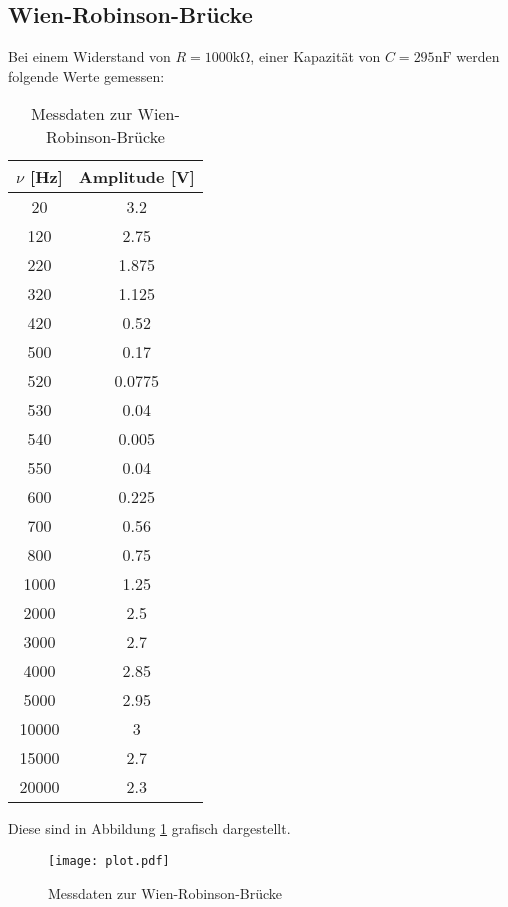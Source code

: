 \subsection{Wien-Robinson-Brücke}
  Bei einem Widerstand von $R=1000 \si{\kilo\ohm}$, einer Kapazität von $C = 295 \si{\nano\farad}$
  werden folgende Werte gemessen:
  \begin{table}[H]
    \centering
    \caption{Messdaten zur Wien-Robinson-Brücke}
    \label{tab:some}
    \begin{tabular}{c c}
     \toprule
      $\nu$ [Hz] & Amplitude [V]\\
     \midrule
     20 & 3.2    \\
     120 & 2.75   \\
     220 & 1.875  \\
     320 & 1.125  \\
     420 & 0.52   \\
     500 & 0.17   \\
     520 & 0.0775 \\
     530 & 0.04   \\
     540 & 0.005  \\
     550 & 0.04   \\
     600 & 0.225  \\
     700 & 0.56   \\
     800 & 0.75   \\
    1000 & 1.25   \\
    2000 & 2.5    \\
    3000 & 2.7    \\
    4000 & 2.85   \\
    5000 & 2.95   \\
    10000 & 3      \\
    15000 & 2.7    \\
    20000 & 2.3    \\
    \bottomrule
    \end{tabular}
  \end{table} 
  Diese sind in Abbildung \ref{fig:plot} grafisch dargestellt.
  \begin{figure}
      \centering
      \texttt{[image: plot.pdf]}
      \caption{Messdaten zur Wien-Robinson-Brücke}
    \label{fig:plot}
  \end{figure}


